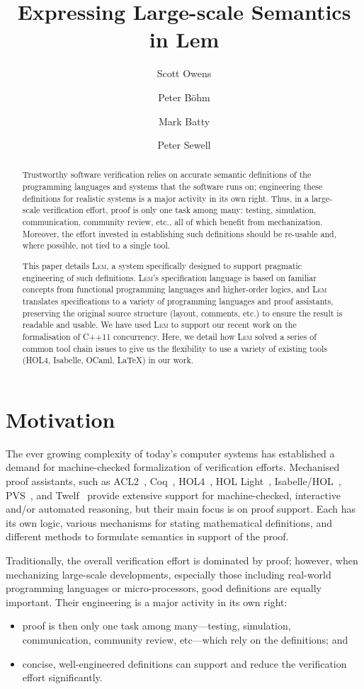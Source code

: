 \documentclass[a4paper]{llncs}
\author{Scott Owens \and Peter B\"ohm \and Mark Batty \and Peter Sewell}
\title{Expressing Large-scale Semantics in Lem}
\institute{University of Cambridge\\ \url{http://www.cl.cam.ac.uk/~so294/lem/}}
\newcommand{\Lem}{\textsc{Lem}}
\begin{document}
\sloppy
\maketitle

\begin{abstract} 
%
Trustworthy software verification relies on accurate semantic definitions of
the programming languages and systems that the software runs on; engineering
these definitions for realistic systems is a major activity in its own right.
Thus, in a large-scale verification effort, proof is only one task among many:
testing, simulation, communication, community review, etc., all of which
benefit from mechanization.  Moreover, the effort invested in establishing such
definitions should be re-usable and, where possible, not tied to a single tool.

This paper details \Lem{}, a system specifically designed to support pragmatic
engineering of such definitions.  \Lem's specification language is based on familiar
concepts from functional programming languages and higher-order logics, and
\Lem{} translates specifications to a variety of programming languages and proof
assistants, preserving the original source structure (layout, comments, etc.)
to ensure the result is readable and usable.  We have used \Lem{} to support
our recent work on the formalisation of C++11 concurrency.  Here, we detail how
\Lem{} solved a series of common tool chain issues to give us the flexibility
to use a variety of existing tools (HOL4, Isabelle, OCaml, \LaTeX{}) in our
work.

\end{abstract}

\section{Motivation} \label{sec:motivation} 
%
The ever growing complexity of today's computer systems has established a
demand for machine-checked formalization of verification efforts.  Mechanised
proof assistants, such as ACL2~\cite{ACL2}, Coq~\cite{Coq}, HOL4~\cite{HOL},
HOL Light~\cite{HOLlight}, Isabelle/HOL~\cite{Isabelle}, PVS~\cite{PVS}, and
Twelf~\cite{Twelf} provide extensive support for machine-checked, interactive
and/or automated reasoning, but their main focus is on proof support.  Each has
its own logic, various mechanisms for stating mathematical definitions, and
different methods to formulate semantics in support of the proof.  

Traditionally, the overall verification effort is dominated by proof; however,
when mechanizing large-scale developments, especially those including
real-world programming languages or micro-processors, good definitions are
equally important.  Their engineering is a major activity in its own
right:
%
\begin{itemize}
  \item proof is then only one task among many---testing, simulation,
    communication, community review, etc---which rely on the
    definitions; and
  \item concise, well-engineered definitions can support and reduce the
    verification effort significantly.
\end{itemize}
 
\end{document}
